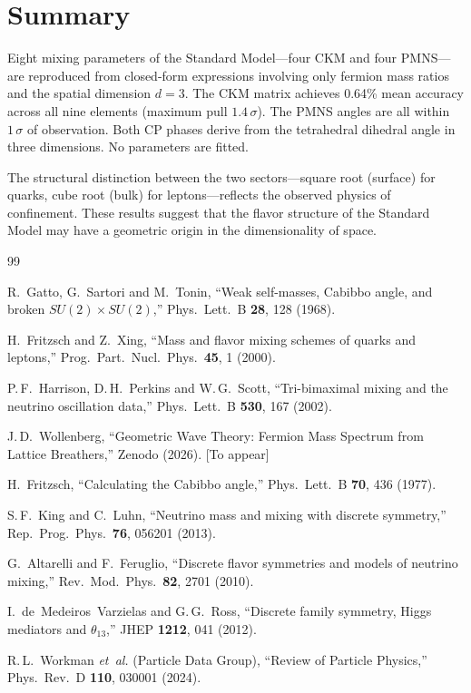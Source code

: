 \documentclass[12pt,a4paper]{article}
\begin{document}
\section{Summary}

Eight mixing parameters of the Standard Model---four CKM and four PMNS---are reproduced from closed-form expressions involving only fermion mass ratios and the spatial dimension $d=3$. The CKM matrix achieves 0.64\% mean accuracy across all nine elements (maximum pull $1.4\,\sigma$). The PMNS angles are all within $1\,\sigma$ of observation. Both CP phases derive from the tetrahedral dihedral angle in three dimensions. No parameters are fitted.

The structural distinction between the two sectors---square root (surface) for quarks, cube root (bulk) for leptons---reflects the observed physics of confinement. These results suggest that the flavor structure of the Standard Model may have a geometric origin in the dimensionality of space.

\begin{thebibliography}{99}

R.~Gatto, G.~Sartori and M.~Tonin,
``Weak self-masses, Cabibbo angle, and broken $SU(2)\times SU(2)$,''
Phys.\ Lett.\ B \textbf{28}, 128 (1968).

H.~Fritzsch and Z.~Xing,
``Mass and flavor mixing schemes of quarks and leptons,''
Prog.\ Part.\ Nucl.\ Phys.\ \textbf{45}, 1 (2000).

P.\,F.~Harrison, D.\,H.~Perkins and W.\,G.~Scott,
``Tri-bimaximal mixing and the neutrino oscillation data,''
Phys.\ Lett.\ B \textbf{530}, 167 (2002).

J.\,D.~Wollenberg,
``Geometric Wave Theory: Fermion Mass Spectrum from Lattice Breathers,''
Zenodo (2026). [To appear]

H.~Fritzsch,
``Calculating the Cabibbo angle,''
Phys.\ Lett.\ B \textbf{70}, 436 (1977).

S.\,F.~King and C.~Luhn,
``Neutrino mass and mixing with discrete symmetry,''
Rep.\ Prog.\ Phys.\ \textbf{76}, 056201 (2013).

G.~Altarelli and F.~Feruglio,
``Discrete flavor symmetries and models of neutrino mixing,''
Rev.\ Mod.\ Phys.\ \textbf{82}, 2701 (2010).

I.~de~Medeiros~Varzielas and G.\,G.~Ross,
``Discrete family symmetry, Higgs mediators and $\theta_{13}$,''
JHEP \textbf{1212}, 041 (2012).

R.\,L.~Workman \textit{et~al.} (Particle Data Group),
``Review of Particle Physics,''
Phys.\ Rev.\ D \textbf{110}, 030001 (2024).

\end{thebibliography}
\end{document}
